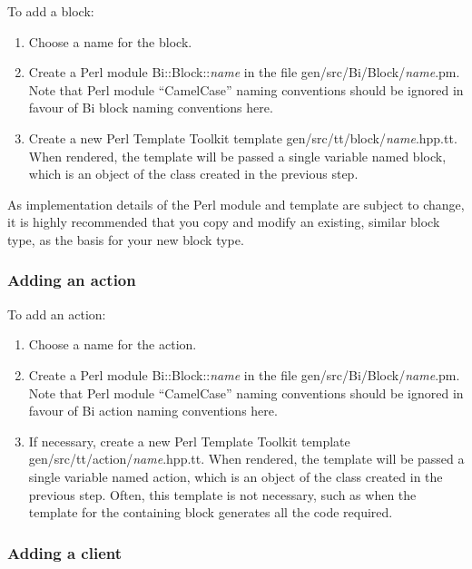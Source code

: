 To add a block:
\begin{enumerate}
\item Choose a name for the block.
\item Create a Perl module \textsf{Bi::Block::\textit{name}} in the
  file \textsf{gen/src/Bi/Block/\textit{name}.pm}. Note that Perl module
  ``CamelCase'' naming conventions should be ignored in favour of Bi block
  naming conventions here.
\item Create a new Perl Template Toolkit template
  \textsf{gen/src/tt/block/\textit{name}.hpp.tt}. When rendered, the template
  will be passed a single variable named \textsf{block}, which is an object of
  the class created in the previous step.
\end{enumerate}

As implementation details of the Perl module and template are subject to
change, it is highly recommended that you copy and modify an existing, similar
block type, as the basis for your new block type.

\subsubsection{Adding an action}

To add an action:
\begin{enumerate}
\item Choose a name for the action.
\item Create a Perl module \textsf{Bi::Block::\textit{name}} in the
  file \textsf{gen/src/Bi/Block/\textit{name}.pm}. Note that Perl module
  ``CamelCase'' naming conventions should be ignored in favour of Bi action
  naming conventions here.
\item If necessary, create a new Perl Template Toolkit template
  \textsf{gen/src/tt/action/\textit{name}.hpp.tt}. When rendered, the template
  will be passed a single variable named \textsf{action}, which is an object
  of the class created in the previous step. Often, this template is not
  necessary, such as when the template for the containing block generates all
  the code required.
\end{enumerate}

\subsubsection{Adding a client\label{Adding_a_client}}

